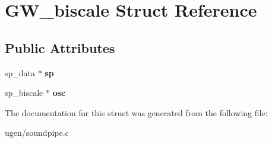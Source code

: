 \hypertarget{structGW__biscale}{}\section{G\+W\+\_\+biscale Struct Reference}
\label{structGW__biscale}
\subsection*{Public Attributes}
\begin{DoxyCompactItemize}
\item 
\hypertarget{structGW__biscale_a73e19eb11111e8308ea451cafe9ad769}{}\label{structGW__biscale_a73e19eb11111e8308ea451cafe9ad769} 
sp\+\_\+data $\ast$ {\bfseries sp}
\item 
\hypertarget{structGW__biscale_a1415927f51dc356c1fd71536787bc86a}{}\label{structGW__biscale_a1415927f51dc356c1fd71536787bc86a} 
sp\+\_\+biscale $\ast$ {\bfseries osc}
\end{DoxyCompactItemize}


The documentation for this struct was generated from the following file\+:\begin{DoxyCompactItemize}
\item 
ugen/soundpipe.\+c\end{DoxyCompactItemize}
